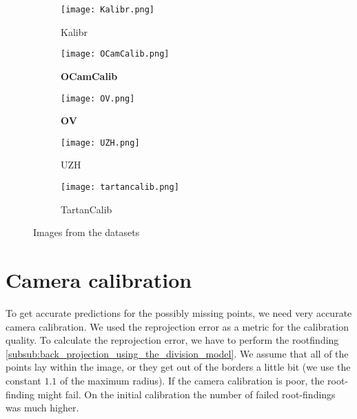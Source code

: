 \begin{figure}[h]
	\centering
	\begin{subfigure}[b]{0.3\linewidth}
		\texttt{[image: Kalibr.png]}
		\caption{Kalibr}
	\end{subfigure}
	\hfill
	\begin{subfigure}[b]{0.3\linewidth}
		\texttt{[image: OCamCalib.png]}
		\caption{\textbf{OCamCalib}}
	\end{subfigure}
	\hfill
	\begin{subfigure}[b]{0.3\linewidth}
		\texttt{[image: OV.png]}
		\caption{\textbf{OV}}
	\end{subfigure}
	\begin{subfigure}[b]{0.3\linewidth}
		\texttt{[image: UZH.png]}
		\caption{UZH}
	\end{subfigure}
	\begin{subfigure}[b]{0.3\linewidth}
		\texttt{[image: tartancalib.png]}
		\caption{TartanCalib}
	\end{subfigure}
	\caption{Images from the datasets}
\end{figure}

\section{Camera calibration}\label{sec:camera_calibration}

\begin{minipage}{0.5\linewidth}
	To get accurate predictions for the possibly missing points, we need
	very accurate camera calibration. We used the reprojection error as a metric
	for the calibration quality.
	To calculate the reprojection error, we have to perform the
	rootfinding \cref{subsub:back_projection_using_the_division_model}. We assume
	that all of the points lay within the image, or they get out of the borders
	a little bit (we use the constant \(1.1\) of the maximum radius). If the
	camera calibration is poor, the root-finding might fail. On the initial
	calibration the number of failed root-findings was much higher.
\end{minipage}
\hfill
\begin{minipage}{0.4\linewidth}
	\captionsetup{width=.9\linewidth}
	\captionsetup{width=.9\linewidth}
\end{minipage}

